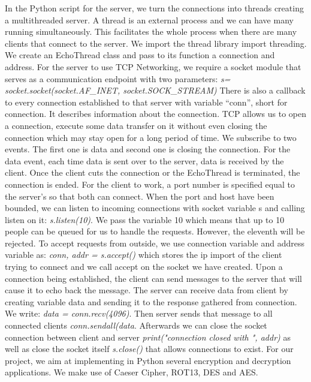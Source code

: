 In the Python script for the server, we turn the connections into threads creating a multithreaded server. A thread is an external process and we can have many running simultaneously. This facilitates the whole process when there are many clients that connect to the server. We import the thread library import threading. We create an EchoThread class and pass to its function a connection and address. For the server to use TCP Networking, we require a socket module that serves as a communication endpoint with two parameters:
\textit{s= socket.socket(socket.AF_INET, socket.SOCK_STREAM)}
There is also a callback to every connection established to that server with variable “conn”, short for connection. It describes information about the connection. TCP allows us to open a connection, execute some data transfer on it without even closing the connection which may stay open for a long period of time. We subscribe to two events. The first one is data and second one is closing the connection. For the data event, each time data is sent over to the server, data is received by the client. Once the client cuts the connection or the EchoThread is terminated, the connection is ended.
For the client to work, a port number is specified equal to the server’s so that both can connect. When the port and host have been bounded, we can listen to incoming connections with socket variable s and calling listen on it: \textit{s.listen(10)}. We pass the variable 10 which means that up to 10 people can be queued for us to handle the requests. However, the eleventh will be rejected. To accept requests from outside, we use connection variable and address variable as: \textit{conn, addr = s.accept()} which stores the ip import of the client trying to connect and we call accept on the socket we have created. Upon a connection being established, the client can send messages to the server that will cause it to echo back the message. The server can receive data from client by creating variable data and sending it to the response gathered from connection. We write: \textit{data = conn.recv(4096)}. Then server sends that message to all connected clients \textit{conn.sendall(data}. Afterwards we can close the socket connection between client and server \textit{print("connection closed with ", addr)} as well as close the socket itself \textit{s.close()} that allows connections to exist.
For our project, we aim at implementing in Python several encryption and decryption applications. We make use of Caeser Cipher, ROT13, DES and AES.
